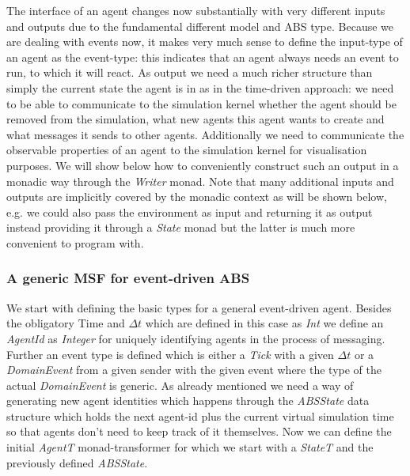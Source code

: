 The interface of an agent changes now substantially with very different inputs and outputs due to the fundamental different model and ABS type. Because we are dealing with events now, it makes very much sense to define the input-type of an agent as the event-type: this indicates that an agent always needs an event to run, to which it will react. As output we need a much richer structure than simply the current state the agent is in as in the time-driven approach: we need to be able to communicate to the simulation kernel whether the agent should be removed from the simulation, what new agents this agent wants to create and what messages it sends to other agents. Additionally we need to communicate the observable properties of an agent to the simulation kernel for visualisation purposes. We will show below how to conveniently construct such an output in a monadic way through the \textit{Writer} monad. Note that many additional inputs and outputs are implicitly covered by the monadic context as will be shown below, e.g. we could also pass the environment as input and returning it as output instead providing it through a \textit{State} monad but the latter is much more convenient to program with.

\subsubsection{A generic MSF for event-driven ABS}
We start with defining the basic types for a general event-driven agent. Besides the obligatory Time and $\Delta t$ which are defined in this case as \textit{Int} we define an \textit{AgentId} as \textit{Integer} for uniquely identifying agents in the process of messaging. Further an event type is defined which is either a \textit{Tick} with a given $\Delta t$ or a \textit{DomainEvent} from a given sender with the given event where the type of the actual \textit{DomainEvent} is generic. As already mentioned we need a way of generating new agent identities which happens through the \textit{ABSState} data structure which holds the next agent-id plus the current virtual simulation time so that agents don't need to keep track of it themselves. Now we can define the initial \textit{AgentT} monad-transformer for which we start with a \textit{StateT} and the previously defined \textit{ABSState}. 

